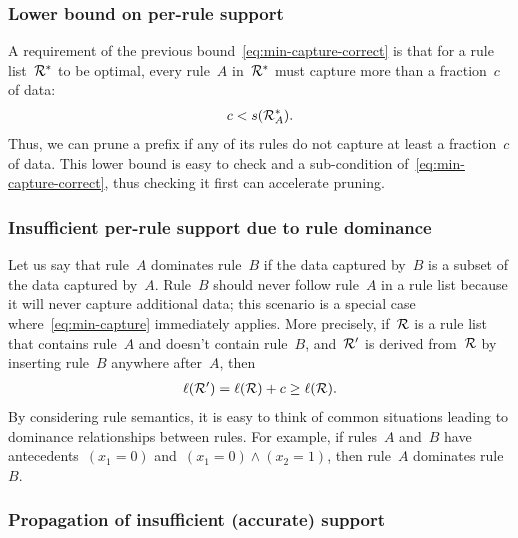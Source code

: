 \subsubsection{Lower bound on per-rule support}

A requirement of the previous bound~\eqref{eq:min-capture-correct}
is that for a rule list~${\mathcal R}^*$ to be optimal, every rule~$A$ in~${\mathcal R}^*$ must
capture more than a fraction~$c$ of data:
\begin{align}
c < s(\RL_A^*).
\label{eq:min-capture}
\end{align}
Thus, we can prune a prefix if any of its rules do not capture at least
a fraction~$c$ of data.
%
This lower bound is easy to check and a sub-condition of~\eqref{eq:min-capture-correct},
thus checking it first can accelerate pruning.

\subsubsection{Insufficient per-rule support due to rule dominance}

Let us say that rule~$A$ dominates rule~$B$ if the data captured by~$B$ is a subset of the data captured by~$A$.
%
Rule~$B$ should never follow rule~$A$ in a rule list because it will never capture additional data;
this scenario is a special case where~\eqref{eq:min-capture} immediately applies.
%
More precisely, if~${\mathcal R}$ is a rule list that contains rule~$A$ and doesn't contain rule~$B$,
and~${\mathcal R}'$ is derived from~${\mathcal R}$ by inserting rule~$B$ anywhere after~$A$, then
\begin{align}
\ell(\RL') = \ell(\RL) + c \ge \ell(\RL).
\end{align}
By considering rule semantics, it is easy to think of common situations
leading to dominance relationships between rules.
%
For example, if rules~$A$ and~$B$ have antecedents~${(x_1 = 0)}$
and~${(x_1 = 0) \wedge (x_2 = 1)}$, then rule~$A$ dominates rule~$B$.
%

\subsubsection{Propagation of insufficient (accurate) support}

